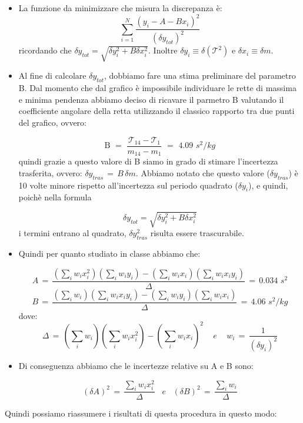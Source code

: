 \begin{itemize}
\item{La funzione da minimizzare che misura la discrepanza è:
		\begin{equation*}
            \sum_{i=1}^{N} \frac{(y_i - A - Bx_i)^2}{(\delta y_{tot})^2}
		\end{equation*}
    ricordando che $\delta y_{tot} = \sqrt{\delta y_i^2 + B\delta x_i^2}$. Inoltre $\delta y_i \equiv \delta (\mathcal{T}^2)$
    e $\delta x_i \equiv \delta m$.}

\item{Al fine di calcolare $\delta y_{tot}$, dobbiamo fare una stima preliminare del parametro B. Dal momento che dal grafico è impossibile individuare le rette di massima e minima pendenza abbiamo deciso di ricavare il parmetro B valutando il coefficiente angolare della retta utilizzando il classico rapporto tra due punti del grafico, ovvero:

	\begin{equation*}
		\text{B} \,\,=\,\, \frac{\mathcal{T}_{14} - \mathcal{T}_{1}}{m_{14} - m_1} \,\,=\,\, 4.09 \,\, s^2/kg
	\end{equation*}
    quindi grazie a questo valore di B siamo in grado di stimare l'incertezza trasferita, ovvero:
    $\delta y_{tras} \,=\, B \, \delta m$. Abbiamo notato che questo valore ($\delta y_{tras}$) è 10
    volte minore rispetto all'incertezza sul periodo quadrato ($\delta y_i$), e quindi, poichè nella formula
	
	\begin{equation*}
		\delta y_{tot} = \sqrt{\delta y_i^2 + B\delta x_i^2}
	\end{equation*}	
	i termini entrano al quadrato, $\delta y_{tras}^2$ risulta essere trascurabile.
	}
\item{Quindi per quanto studiato in classe abbiamo che:

		\begin{equation*}
			A \,=\, \frac{(\sum_i w_i x_i^2)(\sum_i w_i y_i) - (\sum_i w_i x_i)(\sum_i w_i x_i y_i)}{\Delta} \,=\, 0.034 \,\, s^2
		\end{equation*}
		\begin{equation*}
			B \,=\, \frac{(\sum_i w_i)(\sum_i w_i x_i y_i) - (\sum_i w_i y_i)(\sum_i w_i x_i)}{\Delta} \,=\, 4.06 \,\, s^2 / kg
		\end{equation*}
		dove:
		\begin{equation*}
			\Delta \,=\, (\sum_i w_i)(\sum_i w_i x_i^2) - (\sum_i w_i x_i)^2 \,\,\,\,\,\,\, e \,\,\,\,\,\,\,
			w_i \,=\, \frac{1}{(\delta y_i)^2}
		\end{equation*}}
\item{Di conseguenza abbiamo che le incertezze relative su A e B sono:

		\begin{equation*}
			(\delta A)^2 \,=\, \frac{\sum_i w_i x_i^2}{\Delta}  \,\,\,\,\, e \,\,\,\,\,
			(\delta B)^2 \,=\, \frac{\sum_i w_i}{\Delta} 
		\end{equation*}}
\end{itemize} 
Quindi possiamo riassumere i risultati di questa procedura in questo modo:

